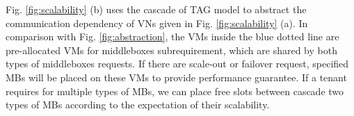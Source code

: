 \documentclass[10pt, conference, letterpaper]{IEEEtran}
\begin{document}
Fig. \ref{fig:scalability} (b) uses the cascade of TAG model to abstract the communication dependency of VNs given in Fig. \ref{fig:scalability} (a). In comparison with Fig. \ref{fig:abstraction}, the VMs inside the blue dotted line are pre-allocated VMs for middleboxes subrequirement, which are shared by both types of middleboxes requests. If there are scale-out or failover request, specified MBs will be placed on these VMs to provide performance guarantee. If a tenant requires for multiple types of MBs, we can place free slots between cascade two types of MBs according to the expectation of their scalability. 

\end{document}

